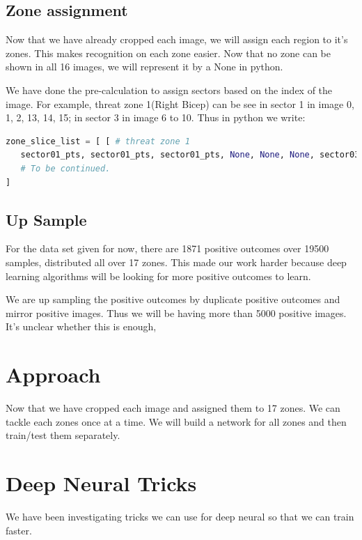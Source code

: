 \documentclass[conference,compsoc]{IEEEtran}
\begin{document}
	\subsection{Zone assignment}
		\par Now that we have already cropped each image, we will assign each region to it's zones. This makes recognition on each zone easier. Now that no zone can be shown in all 16 images, we will represent it by a None in python.
		\par We have done the pre-calculation to assign sectors based on the index of the image. For example, threat zone 1(Right Bicep) can be see in sector 1 in image 0, 1, 2, 13, 14, 15; in sector 3 in image 6 to 10. Thus in python we write:
		\begin{lstlisting}[language = python]
zone_slice_list = [ [ # threat zone 1
   sector01_pts, sector01_pts, sector01_pts, None, None, None, sector03_pts, sector03_pts, sector03_pts, sector03_pts, sector03_pts, None, None, sector01_pts, sector01_pts, sector01_pts ],
   # To be continued.
]
		\end{lstlisting}
	\subsection{Up Sample}
		\par For the data set given for now, there are 1871 positive outcomes over 19500 samples, distributed all over 17 zones. This made our work harder because deep learning algorithms will be looking for more positive outcomes to learn. 
		\par We are up sampling the positive outcomes by duplicate positive outcomes and mirror positive images. Thus we will be having more than 5000 positive images. It's unclear whether this is enough, 
\section{Approach}
	\par Now that we have cropped each image and assigned them to 17 zones. We can tackle each zones once at a time. We will build a network for all zones and then train/test them separately.

\section{Deep Neural Tricks}
	\par We have been investigating tricks we can use for deep neural so that we can train faster.

% 
\end{document}
